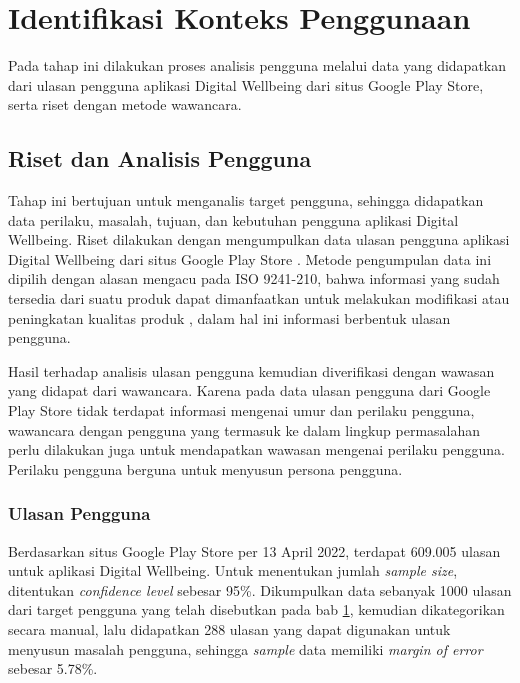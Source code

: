 \section{Identifikasi Konteks Penggunaan}
\label{sec:identifikasi_konteks_penggunaan}

Pada tahap ini dilakukan proses analisis pengguna melalui data yang didapatkan dari ulasan pengguna aplikasi Digital Wellbeing dari situs Google Play Store, serta riset dengan metode wawancara.

\subsection{Riset dan Analisis Pengguna}
\label{subsec:riset_analisis}

Tahap ini bertujuan untuk menganalis target pengguna, sehingga didapatkan data perilaku, masalah, tujuan, dan kebutuhan pengguna aplikasi Digital Wellbeing. Riset dilakukan dengan mengumpulkan data ulasan pengguna aplikasi Digital Wellbeing dari situs Google Play Store \textcite{dwplaystorereviews}. Metode pengumpulan data ini dipilih dengan alasan mengacu pada ISO 9241-210, bahwa informasi yang sudah tersedia dari suatu produk dapat dimanfaatkan untuk melakukan modifikasi atau peningkatan kualitas produk \parencite{iso9241-210:2010}, dalam hal ini informasi berbentuk ulasan pengguna.

Hasil terhadap analisis ulasan pengguna kemudian diverifikasi dengan wawasan yang didapat dari wawancara. Karena pada data ulasan pengguna dari Google Play Store tidak terdapat informasi mengenai umur dan perilaku pengguna, wawancara dengan pengguna yang termasuk ke dalam lingkup permasalahan perlu dilakukan juga untuk mendapatkan wawasan mengenai perilaku pengguna. Perilaku pengguna berguna untuk menyusun persona pengguna.

\subsubsection{Ulasan Pengguna}
\label{subsubsec:ulasan_pengguna}

Berdasarkan situs Google Play Store per 13 April 2022, terdapat 609.005 ulasan untuk aplikasi Digital Wellbeing. Untuk menentukan jumlah \textit{sample size}, ditentukan \textit{confidence level} sebesar 95\%. Dikumpulkan data sebanyak 1000 ulasan dari target pengguna yang telah disebutkan pada bab \ref{sec:identifikasi_konteks_penggunaan},  kemudian dikategorikan secara manual, lalu didapatkan 288 ulasan yang dapat digunakan untuk menyusun masalah pengguna, sehingga \textit{sample} data memiliki \textit{margin of error} sebesar 5.78\%.

